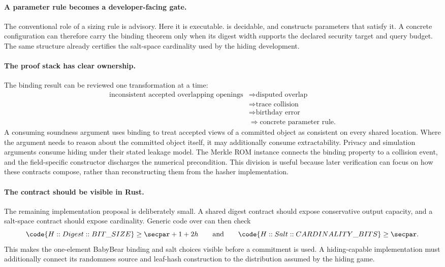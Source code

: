 \label{sec:implications}

\paragraph{A parameter rule becomes a developer-facing gate.}
The conventional role of a sizing rule is advisory.  Here it is executable.
 is decidable, and  constructs
parameters that satisfy it.  A concrete configuration can therefore carry the
binding theorem only when its digest width supports the declared security
target and query budget.  The same structure already certifies the salt-space
cardinality used by the hiding development.

\paragraph{The proof stack has clear ownership.}
The binding result can be reviewed one transformation at a time:
\[
\begin{aligned}
\text{inconsistent accepted overlapping openings}
&\Longrightarrow \text{disputed overlap}\\
&\Longrightarrow \text{trace collision}\\
&\Longrightarrow \text{birthday error}\\
&\Longrightarrow \text{concrete parameter rule}.
\end{aligned}
\]
A consuming soundness argument uses binding to treat
accepted views of a committed object as consistent on every shared location.
Where the argument needs to reason about the committed object itself, it may
additionally consume extractability.
Privacy and simulation arguments consume hiding under their stated leakage
model.  The Merkle ROM instance connects the binding property to a collision
event, and the field-specific constructor discharges the numerical
precondition.  This division is useful because later verification can focus on
how these contracts compose, rather than reconstructing them from the hasher
implementation.

\paragraph{The contract should be visible in Rust.}
The remaining implementation proposal is deliberately small.  A shared digest
contract should expose conservative output capacity, and a salt-space contract
should expose cardinality.  Generic code over  can then
check
\[
\code{H::Digest::BIT\_SIZE}\ge\secpar+1+2h
\qquad\text{and}\qquad
\code{H::Salt::CARDINALITY\_BITS}\ge\secpar.
\]
This makes the one-element BabyBear binding and salt choices visible before a
commitment is used.  A hiding-capable implementation must additionally connect
its randomness source and leaf-hash construction to the distribution assumed
by the hiding game.

